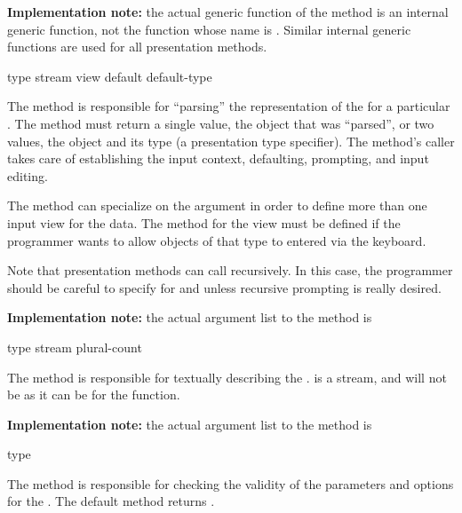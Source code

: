 {\bf Implementation note:} the actual generic function of the 
method is an internal generic function, not the function whose name is
.  Similar internal generic functions are used for all presentation
methods.


 {type stream view \key default default-type}

The  method is responsible for ``parsing'' the representation of the
  for a particular  .
The  method must return a single value, the object that was
``parsed'', or two values, the object and its type (a presentation type
specifier).  The method's caller takes care of establishing the input context,
defaulting, prompting, and input editing.

The  method can specialize on the  argument in order to
define more than one input view for the data.  The  method for the
 view must be defined if the programmer wants to allow objects
of that type to entered via the keyboard.

Note that  presentation methods can call  recursively.  In
this case, the programmer should be careful to specify  for 
and  unless recursive prompting is really desired.

{\bf Implementation note:} the actual argument list to the  method is
\\


 {type stream plural-count}

The  method is responsible for textually
describing the  .   is a stream,
and will not be  as it can be for the 
function.

{\bf Implementation note:} the actual argument list to the
 method is
\\


 {type}

The  method is responsible for checking the
validity of the parameters and options for the 
.  The default method returns .

